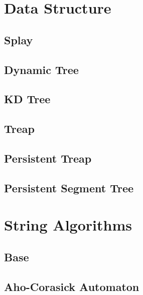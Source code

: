 \documentclass[10pt]{article}
\begin{document}
\tableofcontents
\newpage

\section{Data Structure}
\subsection{Splay}

\subsection{Dynamic Tree}

\subsection{KD Tree}

\subsection{Treap}

\subsection{Persistent Treap}

\subsection{Persistent Segment Tree}


\section{String Algorithms}
\subsection{Base}



\subsection{Aho-Corasick Automaton}

\end{document}
